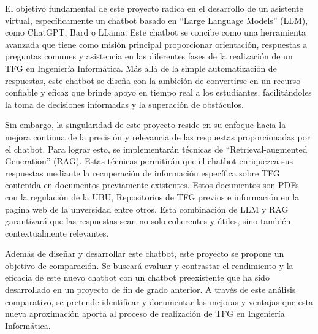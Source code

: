 
El objetivo fundamental de este proyecto radica en el desarrollo de un asistente virtual, específicamente un chatbot basado en ``Large Language Models'' (LLM), como ChatGPT, Bard o LLama. Este chatbot se concibe como una herramienta avanzada que tiene como misión principal proporcionar orientación, respuestas a preguntas comunes y asistencia en las diferentes fases de la realización de un TFG en Ingeniería Informática. Más allá de la simple automatización de respuestas, este chatbot se diseña con la ambición de convertirse en un recurso confiable y eficaz que brinde apoyo en tiempo real a los estudiantes, facilitándoles la toma de decisiones informadas y la superación de obstáculos.

Sin embargo, la singularidad de este proyecto reside en su enfoque hacia la mejora continua de la precisión y relevancia de las respuestas proporcionadas por el chatbot. Para lograr esto, se implementarán técnicas de ``Retrieval-augmented Generation'' (RAG). Estas técnicas permitirán que el chatbot enriquezca sus respuestas mediante la recuperación de información específica sobre TFG contenida en documentos previamente existentes. Estos documentos son PDFs con la regulación de la UBU, Repositorios de TFG previos e información en la pagina web de la unversidad entre otros. Esta combinación de LLM y RAG garantizará que las respuestas sean no solo coherentes y útiles, sino también contextualmente relevantes.

Además de diseñar y desarrollar este chatbot, este proyecto se propone un objetivo de comparación. Se buscará evaluar y contrastar el rendimiento y la eficacia de este nuevo chatbot con un chatbot preexistente que ha sido desarrollado en un proyecto de fin de grado anterior. A través de este análisis comparativo, se pretende identificar y documentar las mejoras y ventajas que esta nueva aproximación aporta al proceso de realización de TFG en Ingeniería Informática.

